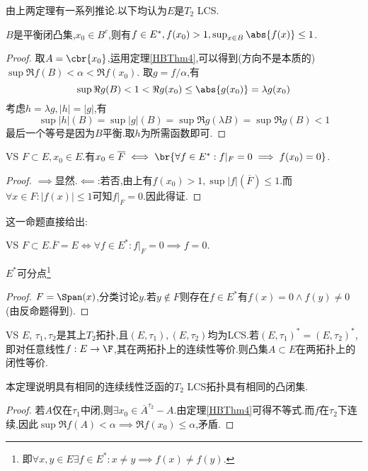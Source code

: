\documentclass{article}
\begin{document}
由上两定理有一系列推论.以下均认为$E$是$T_2$ LCS.

\begin{proposition}\label{HBProp4}
    $B$是平衡闭凸集,$x_0\in B^c$,则有$f\in E^*, f(x_0)>1, \sup_{x\in B}\abs{f(x)}\leq 1$.
\end{proposition}
\begin{proof}
    取$A=\cbr{x_0}$,运用定理\ref{HBThm4},可以得到(方向不是本质的)$\sup \Re f(B)<\alpha<\Re f(x_0).$
    取$g=f/\alpha$,有$$\sup \Re g(B)<1<\Re g(x_0)\leq \abs{g(x_0)}=\lambda g(x_0)$$
    考虑$h=\lambda g, |h|=|g|$,有$$\sup |h|(B)=\sup |g|(B)=\sup \Re g(\lambda B)=\sup \Re g(B)<1$$
    最后一个等号是因为$B$平衡.取$h$为所需函数即可.
\end{proof}
\begin{proposition}
    VS $F\subset E, x_0\in E$.有$x_0\in \overline{F}\iff \br{\forall f\in E^*:f|_F=0\implies f(x_0)=0}$.
\end{proposition}
\begin{proof}
    $\implies$显然.$\impliedby$:若否,由上有$f(x_0)>1, \sup |f|(\overline{F})\leq 1$.而$\forall x\in F:|f(x)|\leq 1$可知$f|_F=0$.因此得证.
\end{proof}
这一命题直接给出:
\begin{proposition}
    VS $F\subset E$.$\overline{F}=E\iff \forall f\in E^*:f|_F=0\implies f=0$.
\end{proposition}
\begin{proposition}
    $E^*$可分点\footnote{即$\forall x,y\in E\exists f\in E^*:x\neq y\implies f(x)\neq f(y)$.}
\end{proposition}
\begin{proof}
    $F=\Span(x)$,分类讨论$y$.若$y\notin F$则存在$f\in E^*$有$f(x)=0\land f(y)\neq 0$(由反命题得到).
\end{proof}

\begin{proposition}[Mazur定理]
    VS $E$, $\tau_1,\tau_2$是其上$T_2$拓扑,且$(E,\tau_1),(E,\tau_2)$均为LCS.若$(E,\tau_1)^*=(E,\tau_2)^*$,即对任意线性$f:E\to \F$,其在两拓扑上的连续性等价.则凸集$A\subset E$在两拓扑上的闭性等价.

    本定理说明具有相同的连续线性泛函的$T_2$ LCS拓扑具有相同的凸闭集.
\end{proposition}
\begin{proof}
    若$A$仅在$\tau_1$中闭,则$\exists x_0\in \overline{A}^{\tau_2}-A$.由定理\ref{HBThm4}可得不等式.而$f$在$\tau_2$下连续,因此$\sup \Re f(A)<\alpha\implies \Re f(x_0)\leq \alpha$,矛盾.
\end{proof}
\end{document}
